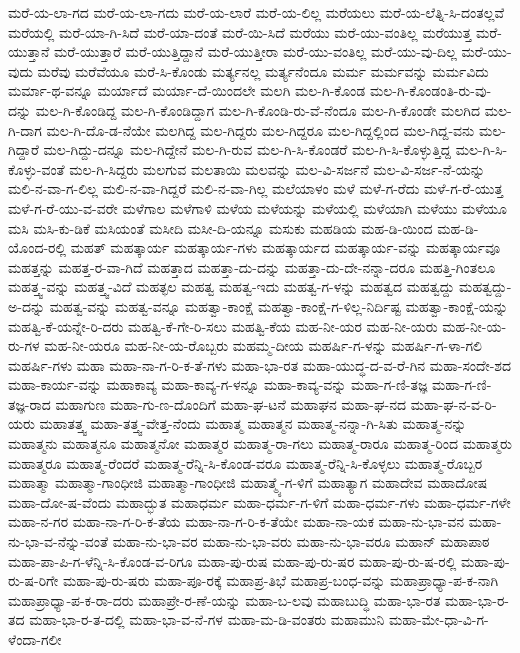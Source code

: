 {ಮರೆ-ಯ-ಲಾ-ಗದ
ಮರೆ-ಯ-ಲಾ-ಗದು
ಮರೆ-ಯ-ಲಾರೆ
ಮರೆ-ಯ-ಲಿಲ್ಲ
ಮರೆಯಲು
ಮರೆ-ಯ-ಲೆತ್ನಿ-ಸಿ-ದಂತಲ್ಲವೆ
ಮರೆಯಲ್ಲಿ
ಮರೆ-ಯಾ-ಗಿ-ಸಿದೆ
ಮರೆ-ಯಾ-ದಂತೆ
ಮರೆ-ಯಿ-ಸಿದೆ
ಮರೆಯು
ಮರೆ-ಯು-ವಂತಿಲ್ಲ
ಮರೆಯುತ್ತ
ಮರೆ-ಯುತ್ತಾನೆ
ಮರೆ-ಯುತ್ತಾರೆ
ಮರೆ-ಯುತ್ತಿದ್ದಾನೆ
ಮರೆ-ಯುತ್ತೀರಾ
ಮರೆ-ಯು-ವಂತಿಲ್ಲ
ಮರೆ-ಯು-ವು-ದಿಲ್ಲ
ಮರೆ-ಯು-ವುದು
ಮರೆವು
ಮರೆವೆಯೂ
ಮರೆ-ಸಿ-ಕೊಂಡು
ಮರ್ತ್ಯನಲ್ಲ
ಮರ್ತ್ಯನೆಂದೂ
ಮರ್ಮ
ಮರ್ಮವನ್ನು
ಮರ್ಮವಿದು
ಮರ್ಮಾ-ಥ-ವನ್ನೂ
ಮರ್ಯಾದೆ
ಮರ್ಯಾ-ದೆ-ಯಿಂದಲೇ
ಮಲಗಿ
ಮಲ-ಗಿ-ಕೊಂಡ
ಮಲ-ಗಿ-ಕೊಂಡಂತಿ-ರು-ವು-ದನ್ನು
ಮಲ-ಗಿ-ಕೊಂಡಿದ್ದ
ಮಲ-ಗಿ-ಕೊಂಡಿದ್ದಾಗ
ಮಲ-ಗಿ-ಕೊಂಡಿ-ರು-ವೆ-ನೆಂದೂ
ಮಲ-ಗಿ-ಕೊಂಡೇ
ಮಲಗಿದ
ಮಲ-ಗಿ-ದಾಗ
ಮಲ-ಗಿ-ದೊ-ಡ-ನೆಯೇ
ಮಲಗಿದ್ದ
ಮಲ-ಗಿದ್ದರು
ಮಲ-ಗಿದ್ದರೂ
ಮಲ-ಗಿದ್ದಲ್ಲಿಂದ
ಮಲ-ಗಿದ್ದ-ವನು
ಮಲ-ಗಿದ್ದಾರೆ
ಮಲ-ಗಿದ್ದು-ದನ್ನೂ
ಮಲ-ಗಿದ್ದೇನೆ
ಮಲ-ಗಿ-ರುವ
ಮಲ-ಗಿ-ಸಿ-ಕೊಂಡರೆ
ಮಲ-ಗಿ-ಸಿ-ಕೊಳ್ಳುತ್ತಿದ್ದ
ಮಲ-ಗಿ-ಸಿ-ಕೊಳ್ಳು-ವಂತೆ
ಮಲ-ಗಿ-ಸಿದ್ದರು
ಮಲಗುವ
ಮಲತಾಯಿ
ಮಲವನ್ನು
ಮಲ-ವಿ-ಸರ್ಜನೆ
ಮಲ-ವಿ-ಸರ್ಜ-ನೆ-ಯನ್ನು
ಮಲಿ-ನ-ವಾ-ಗ-ಲಿಲ್ಲ
ಮಲಿ-ನ-ವಾ-ಗಿದ್ದರೆ
ಮಲಿ-ನ-ವಾ-ಗಿಲ್ಲ
ಮಲೆಯಾಳಂ
ಮಳೆ
ಮಳೆ-ಗ-ರೆದು
ಮಳೆ-ಗ-ರೆ-ಯುತ್ತ
ಮಳೆ-ಗ-ರೆ-ಯು-ವ-ವರೇ
ಮಳೆಗಾಲ
ಮಳೆಗಾಳಿ
ಮಳೆಯ
ಮಳೆಯನ್ನು
ಮಳೆಯಲ್ಲಿ
ಮಳೆಯಾಗಿ
ಮಳೆಯು
ಮಳೆಯೂ
ಮಸಿ
ಮಸಿ-ಕು-ಡಿಕೆ
ಮಸಿಯಂತೆ
ಮಸೀದಿ
ಮಸೀ-ದಿ-ಯನ್ನೂ
ಮಸುಕು
ಮಹಡಿಯ
ಮಹ-ಡಿ-ಯಿಂದ
ಮಹ-ಡಿ-ಯೊಂದ-ರಲ್ಲಿ
ಮಹತ್
ಮಹತ್ಕಾರ್ಯ
ಮಹತ್ಕಾರ್ಯ-ಗಳು
ಮಹತ್ಕಾರ್ಯದ
ಮಹತ್ಕಾರ್ಯ-ವನ್ನು
ಮಹತ್ಕಾರ್ಯವೂ
ಮಹತ್ತನ್ನು
ಮಹತ್ತ-ರ-ವಾ-ಗಿದೆ
ಮಹತ್ತಾದ
ಮಹತ್ತಾ-ದು-ದನ್ನು
ಮಹತ್ತಾ-ದು-ದೇ-ನನ್ನಾ-ದರೂ
ಮಹತ್ತಿ-ಗಿಂತಲೂ
ಮಹತ್ತ್ವ-ವನ್ನು
ಮಹತ್ತ್ವ-ವಿದೆ
ಮಹತ್ಫಲ
ಮಹತ್ವ
ಮಹತ್ವ-ಇದು
ಮಹತ್ವ-ಗ-ಳನ್ನು
ಮಹತ್ವದ
ಮಹತ್ವದ್ದು
ಮಹತ್ವದ್ದು-ಅ-ದನ್ನು
ಮಹತ್ವ-ವನ್ನು
ಮಹತ್ವ-ವನ್ನೂ
ಮಹತ್ವಾ-ಕಾಂಕ್ಷೆ
ಮಹತ್ವಾ-ಕಾಂಕ್ಷೆ-ಗ-ಳಿಲ್ಲ-ನಿರ್ದಿಷ್ಟ
ಮಹತ್ವಾ-ಕಾಂಕ್ಷೆ-ಯನ್ನು
ಮಹತ್ವಿ-ಕೆ-ಯನ್ನೇ-ರಿ-ದರು
ಮಹತ್ವಿ-ಕೆ-ಗೇ-ರಿ-ಸಲು
ಮಹತ್ವಿ-ಕೆಯ
ಮಹ-ನೀ-ಯರ
ಮಹ-ನೀ-ಯರು
ಮಹ-ನೀ-ಯ-ರು-ಗಳ
ಮಹ-ನೀ-ಯರೂ
ಮಹ-ನೀ-ಯ-ರೊಬ್ಬರು
ಮಹಮ್ಮ-ದೀಯ
ಮಹರ್ಷಿ-ಗ-ಳನ್ನು
ಮಹರ್ಷಿ-ಗ-ಳಾ-ಗಲಿ
ಮಹರ್ಷಿ-ಗಳು
ಮಹಾ
ಮಹಾ-ನಾ-ಗ-ರಿ-ಕ-ತೆ-ಗಳು
ಮಹಾ-ಭಾ-ರತ
ಮಹಾ-ಯುದ್ಧ-ದ-ವ-ರೆ-ಗಿನ
ಮಹಾ-ಸಂದೇ-ಶದ
ಮಹಾ-ಕಾರ್ಯ-ವನ್ನು
ಮಹಾಕಾವ್ಯ
ಮಹಾ-ಕಾವ್ಯ-ಗ-ಳನ್ನೂ
ಮಹಾ-ಕಾವ್ಯ-ವನ್ನು
ಮಹಾ-ಗ-ಣಿ-ತಜ್ಞ
ಮಹಾ-ಗ-ಣಿ-ತಜ್ಞ-ರಾದ
ಮಹಾಗುಣ
ಮಹಾ-ಗು-ಣ-ದೊಂದಿಗೆ
ಮಹಾ-ಘ-ಟನೆ
ಮಹಾಘನ
ಮಹಾ-ಘ-ನದ
ಮಹಾ-ಘ-ನ-ವ-ರಿ-ಯರು
ಮಹಾತತ್ತ್ವ
ಮಹಾ-ತತ್ತ್ವ-ವೇತ್ತ-ನೆಂದು
ಮಹಾತ್ಮ
ಮಹಾತ್ಮನ
ಮಹಾತ್ಮ-ನನ್ನಾ-ಗಿ-ಸಿತು
ಮಹಾತ್ಮ-ನನ್ನು
ಮಹಾತ್ಮನು
ಮಹಾತ್ಮನೂ
ಮಹಾತ್ಮನೋ
ಮಹಾತ್ಮರ
ಮಹಾತ್ಮ-ರಾ-ಗಲು
ಮಹಾತ್ಮ-ರಾರೂ
ಮಹಾತ್ಮ-ರಿಂದ
ಮಹಾತ್ಮರು
ಮಹಾತ್ಮರೂ
ಮಹಾತ್ಮ-ರೆಂದರೆ
ಮಹಾತ್ಮ-ರೆನ್ನಿ-ಸಿ-ಕೊಂಡ-ವರೂ
ಮಹಾತ್ಮ-ರೆನ್ನಿ-ಸಿ-ಕೊಳ್ಳಲು
ಮಹಾತ್ಮ-ರೊಬ್ಬರ
ಮಹಾತ್ಮಾ
ಮಹಾತ್ಮಾ-ಗಾಂಧೀಜಿ
ಮಹಾತ್ಮಾ-ಗಾಂಧೀಜಿ
ಮಹಾತ್ಮ್ಯೆ-ಗ-ಳಿಗೆ
ಮಹಾತ್ಯಾಗ
ಮಹಾದೇವ
ಮಹಾದೋಷ
ಮಹಾ-ದೋ-ಷ-ವೆಂದು
ಮಹಾದ್ಭುತ
ಮಹಾಧರ್ಮ
ಮಹಾ-ಧರ್ಮ-ಗ-ಳಿಗೆ
ಮಹಾ-ಧರ್ಮ-ಗಳು
ಮಹಾ-ಧರ್ಮ-ಗಳೇ
ಮಹಾ-ನ-ಗರ
ಮಹಾ-ನಾ-ಗ-ರಿ-ಕ-ತೆಯ
ಮಹಾ-ನಾ-ಗ-ರಿ-ಕ-ತೆಯೇ
ಮಹಾ-ನಾ-ಯಕ
ಮಹಾ-ನು-ಭಾ-ವನ
ಮಹಾ-ನು-ಭಾ-ವ-ನೆನ್ನು-ವಂತೆ
ಮಹಾ-ನು-ಭಾ-ವರ
ಮಹಾ-ನು-ಭಾ-ವರು
ಮಹಾ-ನು-ಭಾ-ವರೂ
ಮಹಾನ್
ಮಹಾಪಾಠ
ಮಹಾ-ಪಾ-ಪಿ-ಗ-ಳೆನ್ನಿ-ಸಿ-ಕೊಂಡ-ವ-ರಿಗೂ
ಮಹಾ-ಪು-ರುಷ
ಮಹಾ-ಪು-ರು-ಷರ
ಮಹಾ-ಪು-ರು-ಷ-ರಲ್ಲಿ
ಮಹಾ-ಪು-ರು-ಷ-ರಿಗೇ
ಮಹಾ-ಪು-ರು-ಷರು
ಮಹಾ-ಪೂ-ರಕ್ಕೆ
ಮಹಾಪ್ರ-ತಿಭೆ
ಮಹಾಪ್ರ-ಬಂಧ-ವನ್ನು
ಮಹಾಪ್ರಾಧ್ಯಾ-ಪ-ಕ-ನಾಗಿ
ಮಹಾಪ್ರಾಧ್ಯಾ-ಪ-ಕ-ರಾ-ದರು
ಮಹಾಪ್ರೇ-ರ-ಣೆ-ಯನ್ನು
ಮಹಾ-ಬ-ಲವು
ಮಹಾಬುದ್ಧಿ
ಮಹಾ-ಭಾ-ರತ
ಮಹಾ-ಭಾ-ರ-ತದ
ಮಹಾ-ಭಾ-ರ-ತ-ದಲ್ಲಿ
ಮಹಾ-ಭಾ-ವ-ನೆ-ಗಳ
ಮಹಾ-ಮ-ಡಿ-ವಂತರು
ಮಹಾಮುನಿ
ಮಹಾ-ಮೇ-ಧಾ-ವಿ-ಗ-ಳೆಂದಾ-ಗಲೀ
}
